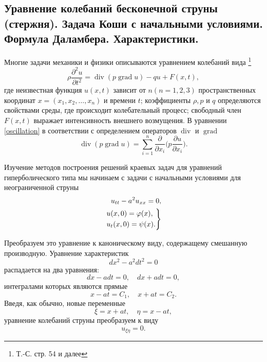 \subsection{Уравнение колебаний бесконечной струны (стержня). Задача Коши с начальными условиями. Формула Даламбера. Характеристики.}
\label{DalamberFormula}

Многие задачи механики и физики описываются уравнением колебаний вида \footnote{Т.-С. стр. 54 и далее}
\begin{equation} \label{oscillation}
	\rho \frac{\partial^2 u}{\partial t^2} = \operatorname{div}(p \operatorname{grad}{u}) - q u + F(x, t),
\end{equation}
где неизвестная функция $ u(x, t) $ зависит от $ n (n = 1, 2, 3)$ пространственных координат $x = (x_1, x_2, \dotsc, x_n)$ и времени $t$; коэффициенты $\rho, p$ и $q$ определяются свойствами среды, где происходит колебательный процесс; свободный член $F(x, t)$ выражает интенсивность внешнего возмущения. В уравнении \eqref{oscillation} в соответствии с определением операторов $\operatorname{div}$ и $\operatorname{grad}$
\begin{equation*}
	\operatorname{div}(p\operatorname{grad} u) = \sum \limits_{i = 1}^{n} \frac{\partial}{\partial x_i} \Big(p \frac{\partial u}{\partial x_i}\Big).
\end{equation*}

Изучение методов построения решений краевых задач для уравнений гиперболического типа мы начинаем с задачи с начальными условиями для неограниченной струны 
\begin{align}
	u_{tt} - a^2 u_{xx} = 0, \label{infinite_string} \\
	\begin{rcases}
		u(x, 0) = \varphi(x), \\
		u_t(x, 0) = \psi(x).
	\end{rcases} \label{inf_str_cond}
\end{align}

Преобразуем это уравнение к каноническому виду, содержащему смешанную производную. Уравнение характеристик 
\begin{equation*}
	d x^2 - a^2 d t^2 = 0 
\end{equation*}
распадается на два уравнения:
\begin{equation*}
	d x - a dt = 0, \quad d x + a dt = 0,
\end{equation*}
интегралами которых являются прямые 
\begin{equation*}
	x - a t = C_1, \quad x + a t = C_2.
\end{equation*}
Введя, как обычно, новые переменные
\begin{equation}
	\xi = x + a t, \quad \eta = x - a t,
\end{equation}
уравнение колебаний струны преобразуем к виду
\begin{equation} \label{homo_oscil}
	u_{\xi \eta} = 0.
\end{equation}

